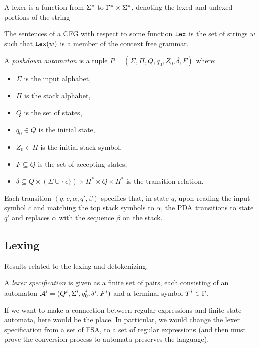 \begin{definition}[Lexer]
    \label{def:Lexer}
    A lexer is a function from $\Sigma^{*}$ to $\Gamma^{*} \times \Sigma^{*}$, denoting the lexed and unlexed portions of the string

\begin{definition}
    \label{def:CFGSentences}
    The sentences of a CFG with respect to some function $\mathtt{Lex}$ is the set of strings $w$ such that $\mathtt{Lex}(w)$ is a member of the context free grammar.
\end{definition}

\begin{definition}
    \label{def:PDA}
    A \emph{pushdown automaton} is a tuple $P = (\Sigma, \Pi, Q, q_0, Z_0, \delta, F)$ where:
    \begin{itemize}
        \item $\Sigma$ is the input alphabet,
        \item $\Pi$ is the stack alphabet,
        \item $Q$ is the set of states,
        \item $q_0 \in Q$ is the initial state,
        \item $Z_0 \in \Pi$ is the initial stack symbol,
        \item $F \subseteq Q$ is the set of accepting states,
        \item $\delta \subseteq Q \times (\Sigma \cup \{\epsilon\}) \times \Pi^* \times Q \times \Pi^*$ is the transition relation.
    \end{itemize}

    Each transition $(q, c, \alpha, q', \beta)$ specifies that, in state $q$, upon reading the input symbol $c$ and matching the top stack symbols to $\alpha$, the PDA transitions to state $q'$ and replaces $\alpha$ with the sequence $\beta$ on the stack.
\end{definition}

\subsection{Lexing}
Results related to the lexing and detokenizing.

\begin{definition}
	\label{def:LexerSpecification}
    A \emph{lexer specification} is given as a finite set of pairs, each consisting of an automaton $\mathcal{A}^i = (Q^i, \Sigma^i, q_{0}^{i}, \delta^i, F^i)$ and a terminal symbol $T^i \in \Gamma$.
\end{definition}
If we want to make a connection between regular expressions and finite state automata, here would be the place. In particular, we would change the lexer specification from a set of FSA, to a set of regular expressions (and then must prove the conversion process to automata preserves the language).


\end{definition}
